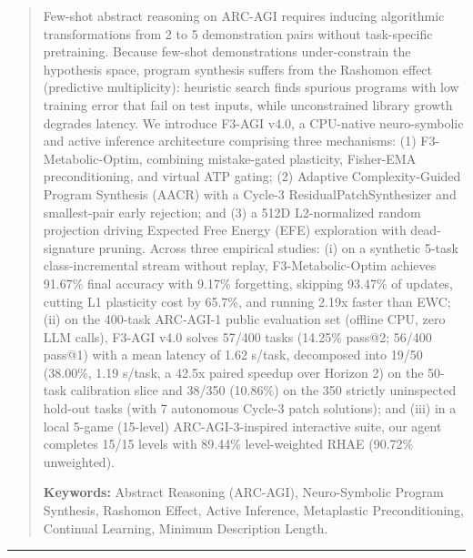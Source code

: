 \documentclass[10pt,a4paper]{article}
\begin{document}
\begin{abstract}
\noindent Few-shot abstract reasoning on ARC-AGI requires inducing algorithmic transformations from 2 to 5 demonstration pairs without task-specific pretraining. Because few-shot demonstrations under-constrain the hypothesis space, program synthesis suffers from the Rashomon effect (predictive multiplicity): heuristic search finds spurious programs with low training error that fail on test inputs, while unconstrained library growth degrades latency. We introduce F3-AGI v4.0, a CPU-native neuro-symbolic and active inference architecture comprising three mechanisms: (1) F3-Metabolic-Optim, combining mistake-gated plasticity, Fisher-EMA preconditioning, and virtual ATP gating; (2) Adaptive Complexity-Guided Program Synthesis (AACR) with a Cycle-3 ResidualPatchSynthesizer and smallest-pair early rejection; and (3) a 512D L2-normalized random projection driving Expected Free Energy (EFE) exploration with dead-signature pruning. Across three empirical studies: (i) on a synthetic 5-task class-incremental stream without replay, F3-Metabolic-Optim achieves 91.67\% final accuracy with 9.17\% forgetting, skipping 93.47\% of updates, cutting L1 plasticity cost by 65.7\%, and running 2.19x faster than EWC; (ii) on the 400-task ARC-AGI-1 public evaluation set (offline CPU, zero LLM calls), F3-AGI v4.0 solves 57/400 tasks (14.25\% pass@2; 56/400 pass@1) with a mean latency of 1.62 s/task, decomposed into 19/50 (38.00\%, 1.19 s/task, a 42.5x paired speedup over Horizon 2) on the 50-task calibration slice and 38/350 (10.86\%) on the 350 strictly uninspected hold-out tasks (with 7 autonomous Cycle-3 patch solutions); and (iii) in a local 5-game (15-level) ARC-AGI-3-inspired interactive suite, our agent completes 15/15 levels with 89.44\% level-weighted RHAE (90.72\% unweighted).

\vspace{5pt}
\noindent\textbf{\color{primary}Keywords:} Abstract Reasoning (ARC-AGI), Neuro-Symbolic Program Synthesis, Rashomon Effect, Active Inference, Metaplastic Preconditioning, Continual Learning, Minimum Description Length.
\end{abstract}

\vspace{4pt}
\hrule height 0.5pt
\vspace{8pt}
\end{document}
